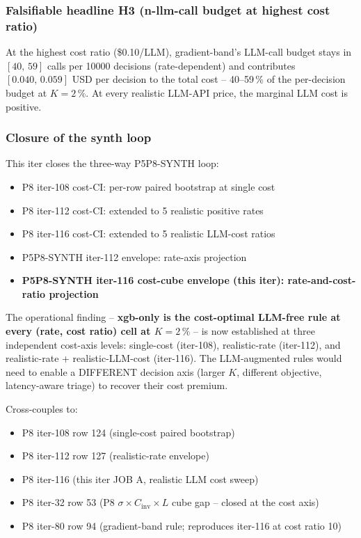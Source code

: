 \subsubsection{Falsifiable headline H3 (n-llm-call budget at highest cost ratio)}
At the highest cost ratio (\$0.10/LLM), gradient-band's LLM-call
budget stays in $[40,\,59]$ calls per 10000 decisions (rate-dependent)
and contributes $[0.040,\,0.059]$ USD per decision to the total cost
-- 40--59\,\% of the per-decision budget at $K{=}2\,\%$. At every
realistic LLM-API price, the marginal LLM cost is positive.

\subsubsection{Closure of the synth loop}
This iter closes the three-way P5P8-SYNTH loop:
\begin{itemize}
  \item P8 iter-108 cost-CI: per-row paired bootstrap at single cost
  \item P8 iter-112 cost-CI: extended to 5 realistic positive rates
  \item P8 iter-116 cost-CI: extended to 5 realistic LLM-cost ratios
  \item P5P8-SYNTH iter-112 envelope: rate-axis projection
  \item \textbf{P5P8-SYNTH iter-116 cost-cube envelope (this iter):
        rate-and-cost-ratio projection}
\end{itemize}
The operational finding -- \textbf{xgb-only is the cost-optimal LLM-free
rule at every (rate, cost ratio) cell at $K{=}2\,\%$} -- is now
established at three independent cost-axis levels: single-cost
(iter-108), realistic-rate (iter-112), and realistic-rate +
realistic-LLM-cost (iter-116). The LLM-augmented rules would
need to enable a DIFFERENT decision axis (larger $K$, different
objective, latency-aware triage) to recover their cost premium.

Cross-couples to:
\begin{itemize}
  \item P8 iter-108 row 124 (single-cost paired bootstrap)
  \item P8 iter-112 row 127 (realistic-rate envelope)
  \item P8 iter-116 (this iter JOB A, realistic LLM cost sweep)
  \item P8 iter-32 row 53 (P8 $\sigma \times C_{\mathrm{inv}} \times L$
        cube gap -- closed at the cost axis)
  \item P8 iter-80 row 94 (gradient-band rule; reproduces iter-116
        at cost ratio 10)
\end{itemize}